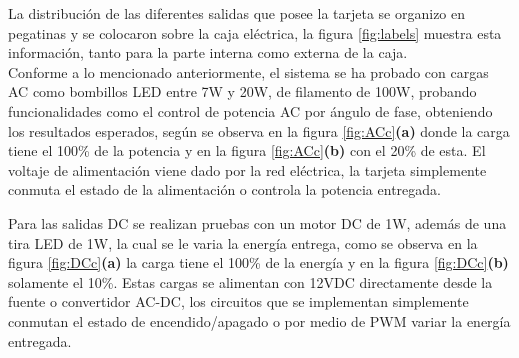 

La distribución de las diferentes salidas que posee la tarjeta se organizo en pegatinas y se colocaron sobre la caja eléctrica, la figura \ref{fig:labels} muestra esta información, tanto para la parte interna como externa de la caja.\\



Conforme a lo mencionado anteriormente, el sistema se ha probado con cargas AC como bombillos LED entre 7W y 20W, de filamento de 100W, probando funcionalidades como el control de potencia AC por ángulo de fase, obteniendo los resultados esperados, según se observa en la figura \ref{fig:ACc}\textbf{(a)} donde la carga tiene el 100\% de la potencia y en la figura \ref{fig:ACc}\textbf{(b)} con el 20\% de esta. El voltaje de alimentación viene dado por la red eléctrica, la tarjeta simplemente conmuta el estado de la alimentación o controla la potencia entregada. 


Para las salidas DC se realizan pruebas con un motor DC de 1W, además de una tira LED de 1W, la cual se le varia la energía entrega, como se observa en la figura \ref{fig:DCc}\textbf{(a)} la carga tiene el 100\% de la energía y en la figura \ref{fig:DCc}\textbf{(b)} solamente el 10\%. Estas cargas se alimentan con 12VDC directamente desde la fuente o convertidor AC-DC, los circuitos que se implementan simplemente conmutan el estado de encendido/apagado o por medio de PWM variar la energía entregada.


